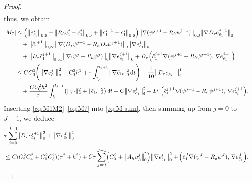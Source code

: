 \begin{proof}
\begin{align}
\end{align}
thus, we obtain
\begin{align}
  |M_{7}|
  &\leq \Bigl(\bigl\|e_{\tilde{c}_{1}}^{j}\bigr\|_{0,6}
             + \bigl\|R_{h}\tilde{c}_{1}^{j} - \tilde{c}_{1}^{j}\bigr\|_{0,6}
             + \bigl\|\tilde{c}_{1}^{j+1} - \tilde{c}_{1}^{j}\bigr\|_{0,6}\Bigr)
    \bigl\|\nabla(\psi^{j+1} - R_{h}\psi^{j+1})\bigr\|_{0,3}
    \bigl\|\nabla D_{\tau}e_{\tilde{c}_{1}}^{j+1}\bigr\|_{0}
  \nonumber\\
  &\quad + \bigl\|\tilde{c}_{1}^{j+1}\bigr\|_{0,\infty}
    \bigl\|\nabla(D_{\tau}\psi^{j+1} - R_{h}D_{\tau}\psi^{j+1})\bigr\|_{0}
    \bigl\|\nabla e_{\tilde{c}_{1}}^{j}\bigr\|_{0}
  \nonumber\\
  &\quad + \bigl\|D_{\tau}\tilde{c}_{1}^{j+1}\bigr\|_{0,\infty}
    \bigl\|\nabla(\psi^{j} - R_{h}\psi^{j})\bigr\|_{0}
    \bigl\|\nabla e_{\tilde{c}_{1}}^{j+1}\bigr\|_{0}
  + D_{\tau}\Bigl(\tilde{c}_{1}^{j+1}\nabla(\psi^{j+1} - R_{h}\psi^{j+1}),\,
                   \nabla e_{\tilde{c}_{1}}^{j+1}\Bigr)
  \nonumber\\
  &\leq CC_{0}^{2}\!\left(\bigl\|\nabla e_{\tilde{c}_{1}}^{j}\bigr\|_{0}^{2}
    + C_{0}^{2}h^{2}
    + \tau\int_{t_{j}}^{t_{j+1}}\|\nabla\tilde{c}_{1t}\|_{0}^{2}\,\mathrm{d}t\right)
   + \frac{1}{10}\bigl\|D_{\tau}e_{\tilde{c}_{1}}^{\phantom{j+1}\!}\bigr\|_{0}^{2}
  \nonumber\\
  &\quad + \frac{CC_{0}^{2}h^{2}}{\tau}\int_{t_{j}}^{t_{j+1}}
    \bigl(\|\psi_{t}\|_{2}^{2} + \|\tilde{c}_{1t}\|_{2}^{2}\bigr)\,\mathrm{d}t
   + C\bigl\|\nabla e_{\tilde{c}_{1}}^{j}\bigr\|_{0}^{2}
   + D_{\tau}\Bigl(\tilde{c}_{1}^{j+1}\nabla(\psi^{j+1} - R_{h}\psi^{j+1}),\,
                   \nabla e_{\tilde{c}_{1}}^{j+1}\Bigr).
  \label{eq:M7}
\end{align}
Inserting \eqref{eq:M1M2}--\eqref{eq:M7} into \eqref{eq:M-sum}, then summing up from
$j = 0$ to $J-1$, we deduce
\begin{align}
  &\tau\sum_{j=0}^{J-1}\bigl\|D_{\tau}e_{\tilde{c}_{1}}^{j+1}\bigr\|_{0}^{2}
   + \bigl\|\nabla e_{\tilde{c}_{1}}^{J}\bigr\|_{0}^{2}
  \nonumber\\
  &\leq C(C_{2}^{2}C_{4}^{2} + C_{0}^{2}C_{5}^{2})(\tau^{2}+h^{2})
   + C\tau\sum_{j=0}^{J-1}\Bigl(C_{0}^{2}
                                 + \bigl\|A_{h}u_{h}^{j}\bigr\|_{0}^{2}\Bigr)
    \bigl\|\nabla e_{\tilde{c}_{1}}^{j}\bigr\|_{0}^{2}
   + \Bigl(\tilde{c}_{1}^{J}\nabla(\psi^{J} - R_{h}\psi^{J}),\,
           \nabla e_{\tilde{c}_{1}}^{J}\Bigr).
  \label{eq:H1-c1-pre}
\end{align}

\end{proof}

